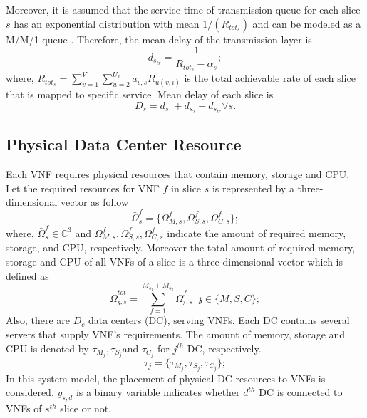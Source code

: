 \documentclass[conference]{IEEEtran}
\begin{document}
Moreover, it is assumed that the service time of transmission queue for each slice $s$ has
 an exponential distribution with mean $1/(R_{{tot}_s})$ and can be modeled as a M/M/1 queue \cite{frdl,luong2018novel,luong2018novel1,guo2016exploiting}. Therefore,
the mean delay of the transmission layer is
\begin{equation}
d_{s_{tr}} = \frac{1}{R_{{tot}_s} - \alpha_{s}};
\end{equation}
where, $R_{{tot}_s} =  \sum_{v=1}^{V}\sum_{u=2}^{U_v}a_{v,s}R_{u(v,i)}$ is the total achievable rate of each slice that is mapped to specific service.
Mean delay of each slice is
\begin{equation}
D_{s} = d_{s_1} + d_{s_2} + d_{s_{tr}} \forall s.
\end{equation}
\subsection{Physical Data Center Resource}
Each VNF requires
physical resources that contain memory, storage and CPU.
Let the required resources for VNF $f$ in slice $s$ is represented by a three-dimensional vector as follow
\begin{equation}
\bar{\Omega}_{s}^f = \{\Omega_{M,{s}}^f, \Omega_{S,{s}}^f, \Omega_{C,{s}}^f \};
\end{equation}
where, $\bar{\Omega}_{s}^f\in \mathbb{C}^{3}$ and $\Omega_{M,{s}}^f, \Omega_{S,{s}}^f, \Omega_{C,{s}}^f$ indicate the amount of required memory, storage, and CPU, respectively.
Moreover the total amount of required memory, storage and CPU of all VNFs of a slice is a three-dimensional vector which is defined as
\begin{equation}
\bar{\Omega}_{\mathfrak{z},s}^{tot} = \sum_{f=1}^{M_{s_1} + M_{s_2}}\bar{\Omega}_{\mathfrak{z},s}^f \;\; \mathfrak{z} \in \{M, S, C\};
\end{equation}
Also, there are $D_c$ data centers (DC), serving VNFs. Each DC contains several servers that supply VNF's requirements.
The amount of memory, storage and CPU is denoted by $\tau_{M_{j}}, \tau_{S_{j}}$and $\tau_{C_{j}} $ for $j^{th}$ DC, respectively.
\begin{equation*}
\tau_j = \{\tau_{M_{j}}, \tau_{S_{j}}, \tau_{C_{j}} \};
\end{equation*}
In this system model, the placement of physical DC resources to VNFs is considered. $y_{s,d}$ is a binary variable indicates whether $d^{th}$ DC is connected to VNFs of $s^{th}$ slice or not.
\end{document}
